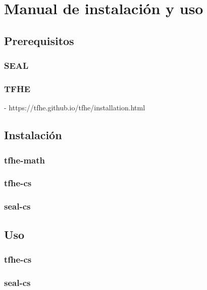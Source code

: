 \chapter{Manual de instalación y uso}
\label{appendix:manual}

\section{Prerequisitos}

\subsection{SEAL}

\subsection{TFHE}

- https://tfhe.github.io/tfhe/installation.html

\section{Instalación}

\subsection{tfhe-math}


\subsection{tfhe-cs}


\subsection{seal-cs}


\section{Uso}


\subsection{tfhe-cs}



\subsection{seal-cs}
